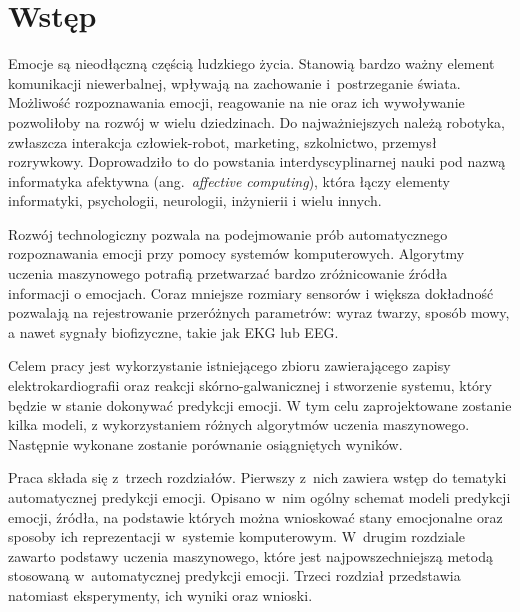 \chapter*{Wstęp}\label{ch:wstep}

Emocje są nieodłączną częścią ludzkiego życia.
Stanowią bardzo ważny element komunikacji niewerbalnej, wpływają na zachowanie i~postrzeganie świata.
Możliwość rozpoznawania emocji, reagowanie na nie oraz ich wywoływanie pozwoliłoby na rozwój w wielu dziedzinach.
Do najważniejszych należą robotyka, zwłaszcza interakcja człowiek-robot, marketing, szkolnictwo, przemysł rozrywkowy.
Doprowadziło to do powstania interdyscyplinarnej nauki pod nazwą informatyka afektywna (ang.~\textit{affective computing}), która łączy elementy informatyki, psychologii, neurologii, inżynierii i wielu innych.

Rozwój technologiczny pozwala na podejmowanie prób automatycznego rozpoznawania emocji przy pomocy systemów komputerowych.
Algorytmy uczenia maszynowego potrafią przetwarzać bardzo zróżnicowanie źródła informacji o emocjach.
Coraz mniejsze rozmiary sensorów i większa dokładność pozwalają na rejestrowanie przeróżnych parametrów: wyraz twarzy, sposób mowy, a nawet sygnały biofizyczne, takie jak EKG lub EEG\@.

Celem pracy jest wykorzystanie istniejącego zbioru zawierającego zapisy elektrokardiografii oraz reakcji skórno-galwanicznej i stworzenie systemu, który będzie w stanie dokonywać predykcji emocji.
W tym celu zaprojektowane zostanie kilka modeli, z wykorzystaniem różnych algorytmów uczenia maszynowego.
Następnie wykonane zostanie porównanie osiągniętych wyników.

Praca składa się z~trzech rozdziałów.
Pierwszy z~nich zawiera wstęp do tematyki automatycznej predykcji emocji.
Opisano w~nim ogólny schemat modeli predykcji emocji, źródła, na podstawie których można wnioskować stany emocjonalne oraz sposoby ich reprezentacji w~systemie komputerowym.
W~drugim rozdziale zawarto podstawy uczenia maszynowego, które jest najpowszechniejszą metodą stosowaną w~automatycznej predykcji emocji.
Trzeci rozdział przedstawia natomiast eksperymenty, ich wyniki oraz wnioski.
